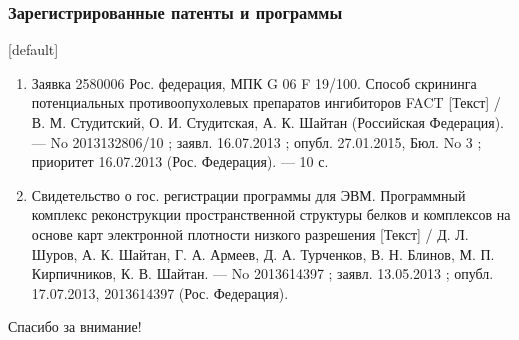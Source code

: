 \normalsize
\begin{frame}
\frametitle{Зарегистрированные патенты и программы}
[default]
\begin{enumerate}
    \justifying
  \item Заявка 2580006 Рос. федерация, МПК G 06 F 19/100. Способ скрининга потенциальных противоопухолевых препаратов ингибиторов FACT [Текст] / В. М. Студитский, О. И. Студитская, А. К. Шайтан (Российская Федерация). — No 2013132806/10 ; заявл. 16.07.2013 ; опубл. 27.01.2015, Бюл. No 3 ; приоритет 16.07.2013 (Рос. Федерация). — 10 с.
\item Свидетельство о гос. регистрации программы для ЭВМ. Программный комплекс реконструкции пространственной структуры белков и комплексов на основе карт электронной плотности низкого разрешения [Текст] / Д. Л. Шуров, А. К. Шайтан, Г. А. Армеев, Д. А. Турченков, В. Н. Блинов, М. П. Кирпичников, К. В. Шайтан. — No 2013614397 ; заявл. 13.05.2013 ; опубл. 17.07.2013, 2013614397 (Рос. Федерация).
\end{enumerate}
\end{frame}


\begin{frame} %
    \begin{center}
        \Huge
        Спасибо за внимание!
    \end{center}
\end{frame}
